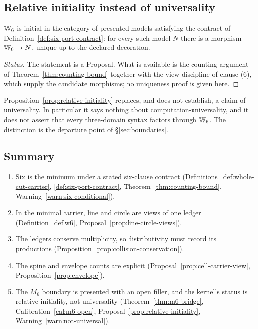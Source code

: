 \subsection{Relative initiality instead of universality}

\begin{proposal}\label{prop:relative-initiality}
$\mathbb{W}_6$ is initial in the category of presented models satisfying the contract of
Definition~\ref{def:six-port-contract}: for every such model $N$ there is a morphism
$\mathbb{W}_6\to N$, unique up to the declared decoration.
\end{proposal}

\begin{proof}[Status]
The statement is a \textsf{Proposal}.  What is available is the counting argument of
Theorem~\ref{thm:counting-bound} together with the view discipline of clause (6), which
supply the candidate morphisms; no uniqueness proof is given here.
\end{proof}

\begin{warning}\label{warn:not-universal}
Proposition~\ref{prop:relative-initiality} replaces, and does not establish, a claim of
universality.  In particular it says nothing about computation-universality, and it does not
assert that every three-domain syntax factors through $\mathbb{W}_6$.  The distinction is the
departure point of \S\ref{sec:boundaries}.
\end{warning}

\subsection{Summary}

\begin{enumerate}
\item Six is the minimum under a stated six-clause contract
  (Definitions~\ref{def:whole-cut-carrier}, \ref{def:six-port-contract},
  Theorem~\ref{thm:counting-bound}, Warning~\ref{warn:six-conditional}).
\item In the minimal carrier, line and circle are views of one ledger
  (Definition~\ref{def:w6}, Proposal~\ref{prop:line-circle-views}).
\item The ledgers conserve multiplicity, so distributivity must record its productions
  (Proposition~\ref{prop:collision-conservation}).
\item The spine and envelope counts are explicit
  (Proposal~\ref{prop:cell-carrier-view}, Proposition~\ref{prop:envelope}).
\item The $M_6$ boundary is presented with an open filler, and the kernel's status is
  relative initiality, not universality
  (Theorem~\ref{thm:m6-bridge}, Calibration~\ref{cal:m6-open},
  Proposal~\ref{prop:relative-initiality}, Warning~\ref{warn:not-universal}).
\end{enumerate}
